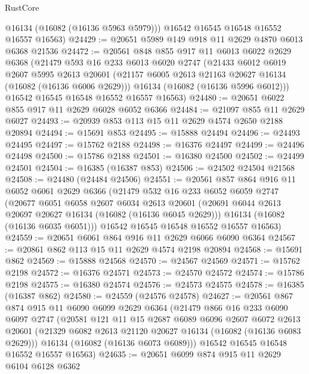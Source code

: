 \begin{lexlean}{RustCore}
\begin{coremodule}
        @16134
        (@16082 (@16136 @5963 @5979)))
      @16542
      @16545
      @16548
      @16552
      @16557
      @16563)
@24429 := @20651 @5989 @149 @918 @11 @2629 @4870 @6013 @6368 @21536
@24472 := @20561
    @848
    @855
    @917
    @11
    @6013
    @6022
    @2629
    @6368
    (@21479
      @593
      @16
      @233
      @6013
      @6020
      @2747
      (@21433
        @6012
        @6019
        @2607
        @5995
        @2613
        @20601
        (@21157 @6005 @2613 @21163 @20627 @16134 (@16082 (@16136 @6006 @2629)))
        @16134
        (@16082 (@16136 @5996 @6012)))
      @16542
      @16545
      @16548
      @16552
      @16557
      @16563)
@24480 := @20651 @6022 @855 @917 @11 @2629 @6028 @6052 @6366
@24484 := @21097 @855 @11 @2629 @6027
@24493 := @20939 @853 @113 @15 @11 @2629 @4574 @2650 @2188 @20894
@24494 := @15691 @853
@24495 := @15888 @24494
@24496 := @24493 @24495
@24497 := @15762 @2188
@24498 := @16376 @24497
@24499 := @24496 @24498
@24500 := @15786 @2188
@24501 := @16380 @24500
@24502 := @24499 @24501
@24504 := @16385 (@16387 @853)
@24506 := @24502 @24504 @21568
@24508 := @24480 (@24484 @24506)
@24551 := @20561
    @857
    @864
    @916
    @11
    @6052
    @6061
    @2629
    @6366
    (@21479
      @532
      @16
      @233
      @6052
      @6059
      @2747
      (@20677
        @6051
        @6058
        @2607
        @6034
        @2613
        @20601
        (@20691 @6044 @2613 @20697 @20627 @16134 (@16082 (@16136 @6045 @2629)))
        @16134
        (@16082 (@16136 @6035 @6051)))
      @16542
      @16545
      @16548
      @16552
      @16557
      @16563)
@24559 := @20651 @6061 @864 @916 @11 @2629 @6066 @6090 @6364
@24567 := @20861 @862 @113 @15 @11 @2629 @4574 @2198 @20894
@24568 := @15691 @862
@24569 := @15888 @24568
@24570 := @24567 @24569
@24571 := @15762 @2198
@24572 := @16376 @24571
@24573 := @24570 @24572
@24574 := @15786 @2198
@24575 := @16380 @24574
@24576 := @24573 @24575
@24578 := @16385 (@16387 @862)
@24580 := @24559 (@24576 @24578)
@24627 := @20561
    @867
    @874
    @915
    @11
    @6090
    @6099
    @2629
    @6364
    (@21479
      @866
      @16
      @233
      @6090
      @6097
      @2747
      (@20581
        @121
        @11
        @15
        @2687
        @6089
        @6096
        @2607
        @6072
        @2613
        @20601
        (@21329 @6082 @2613 @21120 @20627 @16134 (@16082 (@16136 @6083 @2629)))
        @16134
        (@16082 (@16136 @6073 @6089)))
      @16542
      @16545
      @16548
      @16552
      @16557
      @16563)
@24635 := @20651 @6099 @874 @915 @11 @2629 @6104 @6128 @6362

\end{coremodule}
\end{lexlean}
